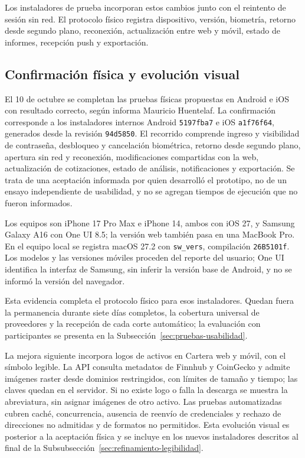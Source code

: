 Los instaladores de prueba incorporan estos cambios junto con el reintento de sesión sin red. El protocolo físico registra dispositivo, versión, biometría, retorno desde segundo plano, reconexión, actualización entre web y móvil, estado de informes, recepción push y exportación.


\subsection{Confirmación física y evolución visual}\label{sec:confirmacion-fisica}

El 10 de octubre se completan las pruebas físicas propuestas en Android e iOS con resultado correcto, según informa Mauricio Huentelaf. La confirmación corresponde a los instaladores internos Android \texttt{5197fba7} e iOS \texttt{a1f76f64}, generados desde la revisión \texttt{94d5850}. El recorrido comprende ingreso y visibilidad de contraseña, desbloqueo y cancelación biométrica, retorno desde segundo plano, apertura sin red y reconexión, modificaciones compartidas con la web, actualización de cotizaciones, estado de análisis, notificaciones y exportación. Se trata de una aceptación informada por quien desarrolló el prototipo, no de un ensayo independiente de usabilidad, y no se agregan tiempos de ejecución que no fueron informados.

Los equipos son iPhone 17 Pro Max e iPhone 14, ambos con iOS 27, y Samsung Galaxy A16 con One UI 8.5; la versión web también pasa en una MacBook Pro. En el equipo local se registra macOS 27.2 con \texttt{sw\_vers}, compilación \texttt{26B5101f}. Los modelos y las versiones móviles proceden del reporte del usuario; One UI identifica la interfaz de Samsung, sin inferir la versión base de Android, y no se informó la versión del navegador.

Esta evidencia completa el protocolo físico para esos instaladores. Quedan fuera la permanencia durante siete días completos, la cobertura universal de proveedores y la recepción de cada corte automático; la evaluación con participantes se presenta en la Subsección~\ref{sec:pruebas-usabilidad}.

La mejora siguiente incorpora logos de activos en Cartera web y móvil, con el símbolo legible. La API consulta metadatos de Finnhub y CoinGecko y admite imágenes raster desde dominios restringidos, con límites de tamaño y tiempo; las claves quedan en el servidor. Si no existe logo o falla la descarga se muestra la abreviatura, sin asignar imágenes de otro activo. Las pruebas automatizadas cubren caché, concurrencia, ausencia de reenvío de credenciales y rechazo de direcciones no admitidas y de formatos no permitidos. Esta evolución visual es posterior a la aceptación física y se incluye en los nuevos instaladores descritos al final de la Subsubsección~\ref{sec:refinamiento-legibilidad}.

